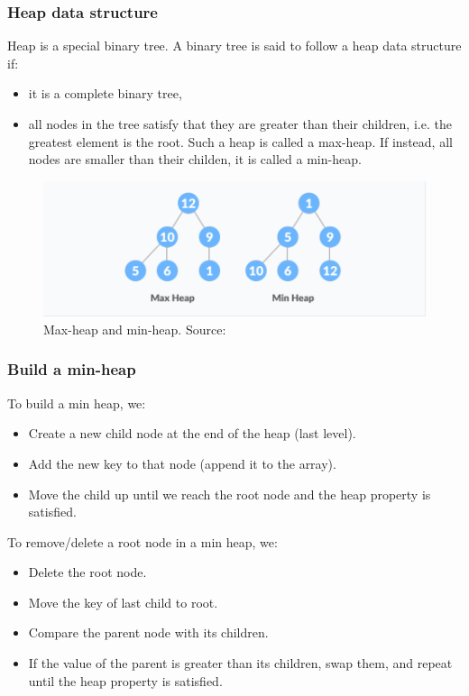 \documentclass[12pt,a4paper]{article}
\begin{document}
\subsubsection{Heap data structure}
Heap is a special binary tree. A binary tree is said to follow a heap data structure if:
\begin{itemize}
\item it is a complete binary tree,
\item all nodes in the tree satisfy that they are greater than their children, i.e. the greatest element is the root. Such a heap is called a max-heap. If instead, all nodes are smaller than their childen, it is called a min-heap. \cite{heap}
\end{itemize}
\begin{figure}[H]
\begin{center}
\includegraphics[scale=0.75]{heap}
\end{center}
\caption{Max-heap and min-heap. Source: \cite{heap}}
\end{figure}
\subsubsection{Build a min-heap}
To build a min heap, we: \cite{heapbuild}
\begin{itemize}
\item Create a new child node at the end of the heap (last level).
\item Add the new key to that node (append it to the array).
\item Move the child up until we reach the root node and the heap property is satisfied.
\end{itemize}
To remove/delete a root node in a min heap, we: \cite{heapbuild}
\begin{itemize}
\item Delete the root node.
\item Move the key of last child to root.
\item Compare the parent node with its children.
\item If the value of the parent is greater than its children, swap them, and repeat until the heap property is satisfied.
\end{itemize}
\end{document}
